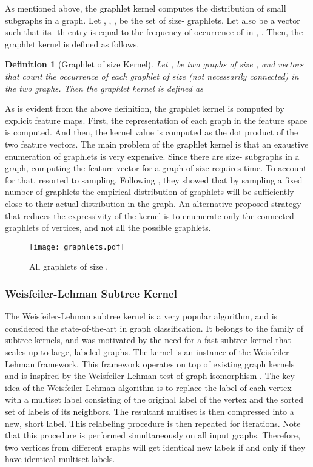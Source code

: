 \documentclass[twoside,11pt]{article}
\newtheorem{definition}{Definition}
\begin{document}
As mentioned above, the graphlet kernel computes the distribution of small subgraphs in a graph.
Let , , ,  be the set of size- graphlets.
Let also  be a vector such that its -th entry is equal to the frequency of occurrence of  in , .
Then, the graphlet kernel is defined as follows.
\begin{definition}[Graphlet of size  Kernel]
  Let ,  be two graphs of size , and  vectors that count the occurrence of each graphlet of size  (not necessarily connected) in the two graphs. 
  Then the graphlet kernel is defined as
  
\end{definition}
As is evident from the above definition, the graphlet kernel is computed by explicit feature maps.
First, the representation of each graph in the feature space is computed.
And then, the kernel value is computed as the dot product of the two feature vectors.
The main problem of the graphlet kernel is that an exaustive enumeration of graphlets is very expensive.
Since there are  size- subgraphs in a graph, computing the feature vector for a graph of size  requires  time.
To account for that,  resorted to sampling. 
Following , they showed that by sampling a fixed number of graphlets the empirical distribution of graphlets will be sufficiently close to their actual distribution in the graph.  
An alternative proposed strategy that reduces the expressivity of the kernel is to enumerate only the connected graphlets of  vertices, and not all the possible graphlets.

\begin{figure}[t]
    \centering
    \texttt{[image: graphlets.pdf]}
    \caption{All graphlets of size .}
    \label{fig:graphlets}
\end{figure}

\subsubsection{Weisfeiler-Lehman Subtree Kernel}
The Weisfeiler-Lehman subtree kernel is a very popular algorithm, and is considered the state-of-the-art in graph classification.
It belongs to the family of subtree kernels, and was motivated by the need for a fast subtree kernel that scales up to large, labeled graphs.
The kernel is an instance of the Weisfeiler-Lehman framework.
This framework operates on top of existing graph kernels and is inspired by the Weisfeiler-Lehman test of graph isomorphism .
The key idea of the Weisfeiler-Lehman algorithm is to replace the label of each vertex with a multiset label consisting of the original label of the vertex and the sorted set of labels of its neighbors.
The resultant multiset is then compressed into a new, short label.
This relabeling procedure is then repeated for  iterations.
Note that this procedure is performed simultaneously on all input graphs.
Therefore, two vertices from different graphs will get identical new labels if and only if they have identical multiset labels.
\end{document}
